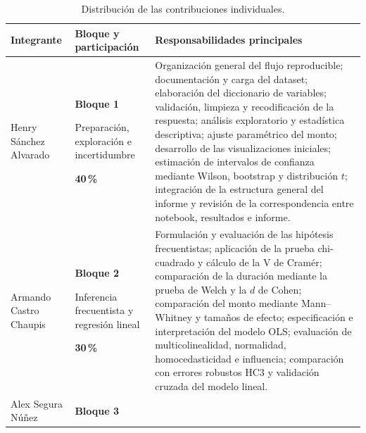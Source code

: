 \begin{table}[H]
    \centering
    \caption{Distribución de las contribuciones individuales.}
    \label{tab:contribuciones-individuales}

    \small
    \begin{tabularx}{\textwidth}{
        @{}
        >{\raggedright\arraybackslash}p{3.1cm}
        >{\raggedright\arraybackslash}p{2.7cm}
        X
        @{}
    }
        \toprule
        Integrante
        & Bloque y participación
        & Responsabilidades principales \\
        \midrule

        Henry Sánchez Alvarado
        &
        \textbf{Bloque 1}

        Preparación, exploración e incertidumbre

        \textbf{40\,\%}
        &
        Organización general del flujo reproducible; documentación y
        carga del dataset; elaboración del diccionario de variables;
        validación, limpieza y recodificación de la respuesta; análisis
        exploratorio y estadística descriptiva; ajuste paramétrico del
        monto; desarrollo de las visualizaciones iniciales; estimación
        de intervalos de confianza mediante Wilson, bootstrap y
        distribución \(t\); integración de la estructura general del
        informe y revisión de la correspondencia entre notebook,
        resultados e informe.
        \\

        \addlinespace

        Armando Castro Chaupis
        &
        \textbf{Bloque 2}

        Inferencia frecuentista y regresión lineal

        \textbf{30\,\%}
        &
        Formulación y evaluación de las hipótesis frecuentistas;
        aplicación de la prueba chi-cuadrado y cálculo de la V de
        Cramér; comparación de la duración mediante la prueba de Welch y
        la \(d\) de Cohen; comparación del monto mediante
        Mann--Whitney y tamaños de efecto; especificación e
        interpretación del modelo OLS; evaluación de multicolinealidad,
        normalidad, homocedasticidad e influencia; comparación con
        errores robustos HC3 y validación cruzada del modelo lineal.
        \\

        \addlinespace

        Alex Segura Núñez
        &
        \textbf{Bloque 3}


\end{tabularx}
\end{table}
